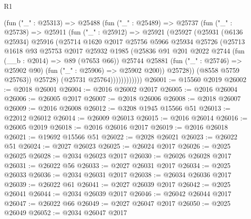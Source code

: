 \begin{lexlean}{R1}
\begin{coremodule}
                  (fun ("_" : @25313) =>
                  @25488
                    (fun ("_" : @25489) =>
                    @25737
                      (fun ("_" : @25738) =>
                      @25911
                        (fun ("_" : @25912) =>
                        @25921
                          (@25927
                            (@25931
                              (@6136 @25934)
                              @25916
                              (@25714
                                @1620
                                @2017
                                @25756
                                @5966
                                @25934
                                @25726
                                (@25713
                                  @1618
                                  @93
                                  @25753
                                  @2017
                                  @25932
                                  @1985
                                  (@25836
                                    @91
                                    @201
                                    @2022
                                    @2744
                                    (fun (__b : @2014) => @89 (@7653 @66))
                                    @25744
                                    @25881
                                    (fun ("_" : @25746) => @25902 @90)
                                    (fun ("_" : @25906) => @25902 @200))
                                  @25728))
                              (@8558 @5759 @25763))
                            @25728)
                          (@25731 @25764))))))))))))
@26001 := @15560 @2019
@26002 := @2018 @26001
@26004 := @2016 @26002 @2017
@26005 := @2016 @26004
@26006 := @26005 @2017
@26007 := @2018 @26006
@26008 := @2018 @26007
@26009 := @2016 @26008
@26012 := @3208 @1945 @15566 @51
@26013 := @22012 @26012
@26014 := @26009 @26013
@26015 := @2016 @26014
@26016 := @26005 @2019
@26018 := @2016 @26016 @2017
@26019 := @2016 @26018
@26021 := @19692 @15566 @51
@26022 := @2028 @26021
@26023 := @26022 @51
@26024 := @2027 @26023
@26025 := @26024 @2017
@26026 := @2025 @26025
@26028 := @2034 @26023 @2017
@26030 := @26026 @26028 @2017
@26031 := @26022 @56
@26033 := @2027 @26031 @2017
@26034 := @2025 @26033
@26036 := @2034 @26031 @2017
@26038 := @26034 @26036 @2017
@26039 := @26022 @61
@26041 := @2027 @26039 @2017
@26042 := @2025 @26041
@26044 := @2034 @26039 @2017
@26046 := @26042 @26044 @2017
@26047 := @26022 @66
@26049 := @2027 @26047 @2017
@26050 := @2025 @26049
@26052 := @2034 @26047 @2017

\end{coremodule}
\end{lexlean}
